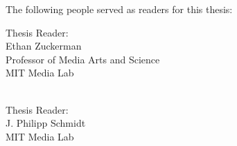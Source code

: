 \begin{titlepage}
      {\setlength{\parindent}{0cm}
        \large  


        \hfill







        \vfill        

        The following people served as readers for this thesis:
        \\ \bigskip

 

        Thesis Reader:\\
        Ethan Zuckerman\\
        Professor of Media Arts and Science\\
        MIT Media Lab\\
        \\ \bigskip

        Thesis Reader:\\
        J. Philipp Schmidt\\
        MIT Media Lab\\         

        


        





        }
\end{titlepage}   
